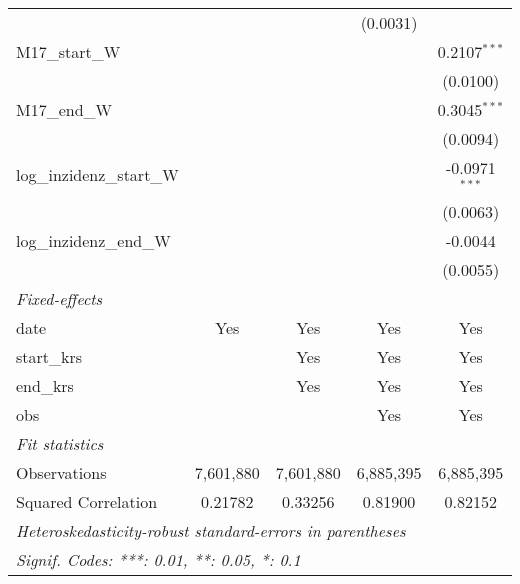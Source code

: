 \documentclass[10pt,a4paper]{article}
\begin{document}
\begin{tabular}{lcccc}
                                                &                 &                 & (0.0031)        &   \\   
   M17\_start\_W                                &                 &                 &                 & 0.2107$^{***}$\\   
                                                &                 &                 &                 & (0.0100)\\   
   M17\_end\_W                                  &                 &                 &                 & 0.3045$^{***}$\\   
                                                &                 &                 &                 & (0.0094)\\   
   log\_inzidenz\_start\_W                      &                 &                 &                 & -0.0971$^{***}$\\   
                                                &                 &                 &                 & (0.0063)\\   
   log\_inzidenz\_end\_W                        &                 &                 &                 & -0.0044\\   
                                                &                 &                 &                 & (0.0055)\\   
   \midrule
   \emph{Fixed-effects}\\
   date                                         & Yes             & Yes             & Yes             & Yes\\  
   start\_krs                                   &                 & Yes             & Yes             & Yes\\  
   end\_krs                                     &                 & Yes             & Yes             & Yes\\  
   obs                                          &                 &                 & Yes             & Yes\\  
   \midrule
   \emph{Fit statistics}\\
   Observations                                 & 7,601,880       & 7,601,880       & 6,885,395       & 6,885,395\\  
   Squared Correlation                          & 0.21782         & 0.33256         & 0.81900         & 0.82152\\  
   \midrule \midrule
   \multicolumn{5}{l}{\emph{Heteroskedasticity-robust standard-errors in parentheses}}\\
   \multicolumn{5}{l}{\emph{Signif. Codes: ***: 0.01, **: 0.05, *: 0.1}}\\
\end{tabular}
\par\endgroup 
\end{document}
